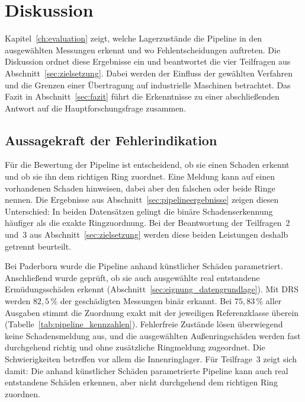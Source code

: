 \chapter{Diskussion}
\label{ch:diskussion}

Kapitel~\ref{ch:evaluation} zeigt, welche Lagerzustände die Pipeline in den
ausgewählten Messungen erkennt und wo Fehlentscheidungen auftreten.
Die Diskussion ordnet diese Ergebnisse ein und beantwortet die vier
Teilfragen aus Abschnitt~\ref{sec:zielsetzung}. Dabei werden der Einfluss
der gewählten Verfahren und die Grenzen einer Übertragung auf industrielle
Maschinen betrachtet. Das Fazit in Abschnitt~\ref{sec:fazit} führt die
Erkenntnisse zu einer abschließenden Antwort auf die Hauptforschungsfrage
zusammen.

\section{Aussagekraft der Fehlerindikation}
\label{sec:aussagekraft_ergebnisse}

Für die Bewertung der Pipeline ist entscheidend, ob sie einen Schaden
erkennt und ob sie ihn dem richtigen Ring zuordnet. Eine Meldung kann auf
einen vorhandenen Schaden hinweisen, dabei aber den falschen oder beide
Ringe nennen. Die Ergebnisse aus Abschnitt~\ref{sec:pipelineergebnisse}
zeigen diesen Unterschied: In beiden Datensätzen gelingt die binäre
Schadenserkennung häufiger als die exakte Ringzuordnung. Bei der
Beantwortung der Teilfragen~2 und~3 aus Abschnitt~\ref{sec:zielsetzung}
werden diese beiden Leistungen deshalb getrennt beurteilt.

Bei Paderborn wurde die Pipeline anhand künstlicher Schäden parametriert.
Anschließend wurde geprüft, ob sie auch ausgewählte real entstandene
Ermüdungsschäden erkennt
(Abschnitt~\ref{sec:eignung_datengrundlage}).
Mit DRS werden $82{,}5\,\%$ der geschädigten Messungen binär erkannt.
Bei $75{,}83\,\%$ aller Ausgaben stimmt die Zuordnung exakt mit der
jeweiligen Referenzklasse überein
(Tabelle~\ref{tab:pipeline_kennzahlen}). Fehlerfreie Zustände lösen
überwiegend keine Schadensmeldung aus, und die ausgewählten Außenringschäden
werden fast durchgehend richtig und ohne zusätzliche Ringmeldung zugeordnet.
Die Schwierigkeiten betreffen vor allem die Innenringlager.
Für Teilfrage~3 zeigt sich damit: Die anhand künstlicher Schäden
parametrierte Pipeline kann auch real entstandene Schäden erkennen,
aber nicht durchgehend dem richtigen Ring zuordnen.

